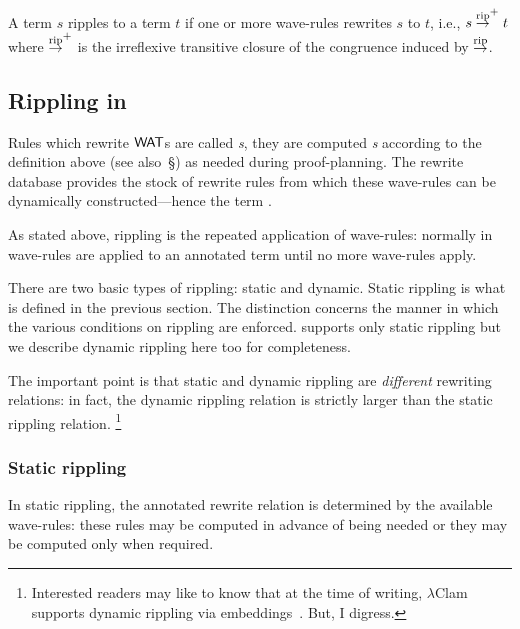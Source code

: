 \begin{defn}[Rippling]
A term $s$ ripples to a term $t$ if one or more wave-rules rewrites
$s$ to $t$, i.e., $s\stackrel{\rm rip}{\rightarrow}^+t$ where $\stackrel{\rm rip}{\rightarrow}^+$ is the irreflexive
transitive closure of the congruence induced by $\stackrel{\rm rip}{\rightarrow}$.
\end{defn}

\subsection {Rippling in \clam}
 
Rules which rewrite ${\sf WAT}$s are called {\em {}s},
they are computed {\em {}s\/} according to the
definition above 
(see also~\S{}) as needed during
proof-planning.  The rewrite database provides the stock of \inx
{rewrite rules} from which these wave-rules can be dynamically
constructed---hence the term {\em {}}.

As stated above, rippling is the repeated application of wave-rules:
normally in \clam{} wave-rules are applied to an annotated term until
no more wave-rules apply.

There are two basic types of rippling: static and dynamic.  Static
rippling is what is defined in the previous section.  The
distinction concerns the manner in which the various conditions on
rippling are enforced.  \clam supports only static rippling but
we describe dynamic rippling here too for completeness.

The important point is that static and dynamic rippling are {\em
different\/} rewriting relations: in fact, the dynamic rippling
relation is strictly larger than the static rippling relation.
\footnote{Interested readers may like to know that at the time of writing,
$\lambda$Clam~\cite{Richardson+98} supports dynamic rippling via
embeddings~\cite{pub799}.  But, I digress.}

\subsubsection {Static rippling}
In static rippling, the annotated rewrite relation is determined by
the available wave-rules: these rules may be computed in advance of
being needed  or they may be computed only when required.  

